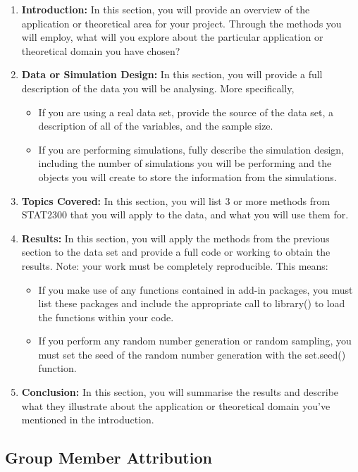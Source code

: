 \documentclass[10pt]{article}
\begin{document}
\begin{enumerate}
    \item \textbf{Introduction:} In this section, you will provide an overview of the application or theoretical area for your project. Through the methods you will employ, what will you explore about the particular application or theoretical domain you have chosen?
    \item \textbf{Data or Simulation Design:} In this section, you will provide a full description of the data you will be analysing. More specifically,
    \begin{itemize}
        \item If you are using a real data set, provide the source of the data set, a description of all of the variables, and the sample size.
        \item If you are performing simulations, fully describe the simulation design, including the number of simulations you will be performing and the objects you will create to store the information from the simulations.
    \end{itemize}
    \item \textbf{Topics Covered:} In this section, you will list 3 or more methods from STAT2300 that you will apply to the data, and what you will use them for.
    \item \textbf{Results:} In this section, you will apply the methods from the previous section to the data set and provide a full code or working to obtain the results. Note: your work must be completely reproducible. This means:
    \begin{itemize}
        \item If you make use of any functions contained in add-in packages, you must list these packages and include the appropriate call to library() to load the functions within your code.
        \item If you perform any random number generation or random sampling, you must set the seed of the random number generation with the set.seed() function.
    \end{itemize}
    \item \textbf{Conclusion:} In this section, you will summarise the results and describe what they illustrate about the application or theoretical domain you've mentioned in the introduction.
\end{enumerate}

\subsection*{Group Member Attribution}
\end{document}
